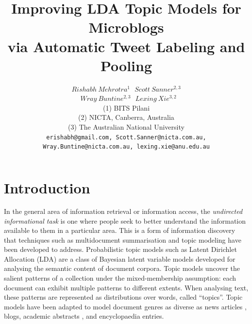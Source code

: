 \documentclass[10pt,a5paper,twoside]{article}
\title{Improving LDA Topic Models for Microblogs\\ via Automatic Tweet Labeling and Pooling}
\author{$Rishabh~Mehrotra^{1}~~~Scott~Sanner^{2, 3}$\\$~~~Wray~Buntine^{2, 3}~~~Lexing~Xie^{3, 2}$\\
{\small  	(1) BITS Pilani\\ 
         	(2) NICTA, Canberra, Australia\\ 
 		(3) The Australian National University\\
  \texttt{erishabh@gmail.com, Scott.Sanner@nicta.com.au, Wray.Buntine@nicta.com.au, lexing.xie@anu.edu.au} \\ 
}}
\begin{document}
\maketitle


\newpage
\section{Introduction}

\label{sec:intro}

In the general area of information retrieval or information access,
the {\it undirected informational task} \cite{RoseLev} is one where
people seek to better understand the information available to them in
a particular area.  This is a form of information discovery that
techniques such as multidocument summarisation \cite{radev02} and
topic modeling have been developed to address.  Probabilistic topic
models such as Latent Dirichlet Allocation (LDA) \cite{blei03} are a
class of Bayesian latent variable models developed for analysing the
semantic content of document corpora.  Topic models uncover the salient
patterns of a collection under the mixed-membership assumption: each
document can exhibit multiple patterns to different extents.  When
analysing text, these patterns are represented as distributions over
words, called “topics”.  Topic models have been adapted to model
document genres as diverse as news articles \cite{baldwin11}, blogs,
academic abstracts \cite{acadz}, and encyclopaedia entries.
\end{document}
